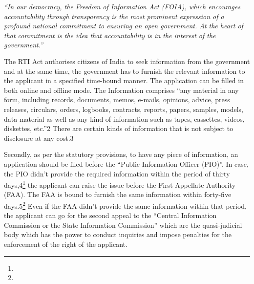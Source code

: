 \begin{multicols}{2}
\textit{“In our democracy, the Freedom of Information Act (FOIA), which encourages
accountability through transparency is the most prominent expression of a profound
national commitment to ensuring an open government. At the heart of that
commitment is the idea that accountability is in the interest of the government.”}

\noi
The RTI Act authorises citizens of India to seek information from the government and at the
same time, the government has to furnish the relevant information to the applicant in a
specified time-bound manner. The application can be filled in both online and offline mode.
The Information comprises “any material in any form, including records, documents, memos,
e-mails, opinions, advice, press releases, circulars, orders, logbooks, contracts, reports,
papers, samples, models, data material as well as any kind of information such as tapes,
cassettes, videos, diskettes, etc.”2  There are certain kinds of information that is not subject to
disclosure at any cost.3

\noi
Secondly, as per the statutory provisions, to have any piece of information, an application
should be filed before the “Public Information Officer (PIO)”. In case, the PIO didn’t provide
the required information within the period of thirty days,4\footnote{}  the applicant can raise the issue
before the First Appellate Authority (FAA). The FAA is bound to furnish the same
information within forty-five days.5\footnote{} Even if the FAA didn’t provide the same information
within that period, the applicant can go for the second appeal to the “Central Information
Commission or the State Information Commission” which are the quasi-judicial body which
has the power to conduct inquiries and impose penalties for the enforcement of the right of
the applicant. 


\end{multicols}
